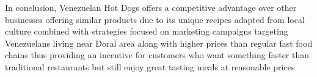 In conclusion, Venezuelan Hot Dogs offers a competitive advantage over other businesses offering similar products due to its unique recipes adapted from local culture combined with strategies focused on marketing campaigns targeting Venezuelans living near Doral area along with higher prices than regular fast food chains thus providing an incentive for customers who want something faster than traditional restaurants but still enjoy great tasting meals at reasonable prices